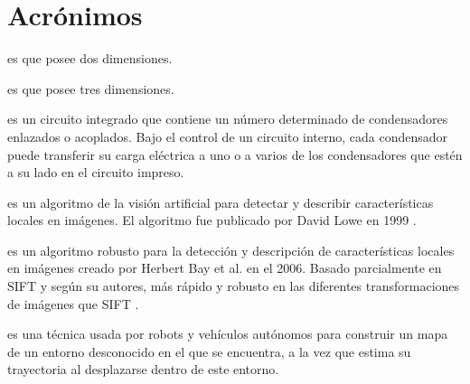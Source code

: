\chapter{Acrónimos}

\begin{acronym}

 es que posee dos dimensiones.

 es que posee tres dimensiones.

 es un circuito integrado que contiene un número determinado de condensadores enlazados o acoplados. Bajo el control de un circuito interno, cada condensador puede transferir su carga eléctrica a uno o a varios de los condensadores que estén a su lado en el circuito impreso.

 es un algoritmo de la visión artificial para detectar y describir características locales en imágenes. El algoritmo fue publicado por David Lowe en 1999 \cite{Lowe_1999}.

 es un algoritmo robusto para la detección y descripción de características locales en imágenes creado por Herbert Bay et al. en el 2006. Basado parcialmente en \ac{SIFT} y según su autores, más rápido y robusto en las diferentes transformaciones de imágenes que \ac{SIFT} \cite{Bay_Ess_Tuytelaars_Vangool_2008}.

 es una t\'{e}cnica usada por robots y veh\'{i}culos aut\'{o}nomos para construir un mapa de un entorno desconocido en el que se encuentra, a la vez que estima su trayectoria al desplazarse dentro de este entorno.


\end{acronym}